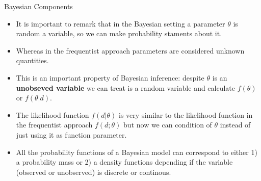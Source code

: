 \documentclass[handout]{beamer}
\begin{document}
\begin{frame}{Bayesian Components}
\scriptsize{
\begin{itemize}

\item It is important to remark that in the Bayesian setting a parameter $\theta$ is random a variable, so we can make probability staments about it.

\item Whereas in the frequentist approach parameters are considered unknown quantities. 

\item This is an important property of Bayesian inference: despite $\theta$ is an \textbf{unobseved variable} we can treat is a random variable and calculate $f(\theta)$ or $f(\theta|d)$.

\item The likelihood function  $f(d|\theta)$ is very similar to the likelihood function in the frequentist approach $f(d;\theta)$ but now we can condition of $\theta$ instead of just using it as function parameter.

\item All the probability functions of a Bayesian model can correspond to either 1) a probability mass or 2) a density functions depending if the variable (observed or unobserved) is discrete or continous.

\end{itemize}
 } 

\end{frame}
\end{document}
